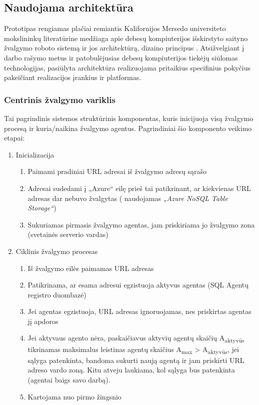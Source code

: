 \subsection{Naudojama architektūra}

Prototipas rengiamas plačiai remiantis Kalifornijos Mersedo universiteto mokslininkų literatūrine medžiaga apie debesų kompiuterijos išskirstyto saityno žvalgymo roboto sistemą ir jos architektūrą, dizaino principus \cite{MercedCloudBasedWebCrawler}. Atsižvelgiant į darbo rašymo metus ir patobulėjusias debesų kompiuterijos tiekėjų siūlomas technologijas, pasiūlyta architektūra realizuojama pritaikius specifinius pokyčius pakeičiant realizacijos įrankius ir platformas.  



\subsubsection{Centrinis žvalgymo variklis}
 
 Tai pagrindinis sistemos struktūrinis komponentas, kuris inicijuoja visą žvalgymo procesą ir kuria/naikina žvalgymo agentus. Pagrindiniai šio komponento veikimo etapai:
 \begin{enumerate}
     \item Inicializacija
     \begin{enumerate}
         \item Paimami pradiniai URL adresai iš žvalgymo adresų sąrašo
         \item Adresai sudedami į „Azure“ eilę prieš tai patikrinant, ar kiekvienas URL adresas dar nebuvo žvalgytas ( naudojamas \textit{„Azure NoSQL Table Storage“})
         \item Sukuriamas pirmasis žvalgymo agentas, jam priskiriama jo žvalgymo zona (svetainės serverio vardas)
     \end{enumerate}
     \item Ciklinis žvalgymo procesas
     \begin{enumerate}
         \item Iš žvalgymo eilės paimamas URL adresas
         \item Patikrinama, ar esama adresui egzistuoja aktyvus agentas (SQL Agentų registro duombazė)
         \item Jei agentas egzistuoja, URL adresas ignoruojamas, nes priskirtas agentas jį apdoros
         \item Jei aktyvaus agento nėra, paskaičiavus aktyvių agentų skaičių A\textsubscript{aktyvūs} tikrinamas maksimalus leistinas agentų skaičius A\textsubscript{max} > A\textsubscript{aktyvūs}, jei sąlyga patenkinta, bandoma sukurti naują agentą ir jam priskirti URL adreso vardo zoną. Kitu atveju laukiama, kol sąlyga bus patenkinta (agentai baigs savo darbą).
         \item Kartojama nuo pirmo žingsnio
     \end{enumerate}
 \end{enumerate}
 
